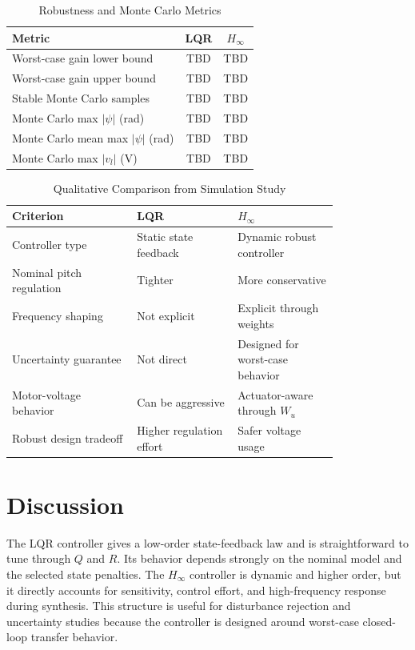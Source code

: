\documentclass[conference]{IEEEtran}
\begin{document}
\begin{table}[!t]
\caption{Robustness and Monte Carlo Metrics}
\label{tab:robust_metrics}
\centering
\begin{tabular}{lcc}
\toprule
Metric & LQR & $H_\infty$\\
\midrule
Worst-case gain lower bound & TBD & TBD\\
Worst-case gain upper bound & TBD & TBD\\
Stable Monte Carlo samples & TBD & TBD\\
Monte Carlo max $|\psi|$ (rad) & TBD & TBD\\
Monte Carlo mean max $|\psi|$ (rad) & TBD & TBD\\
Monte Carlo max $|v_l|$ (V) & TBD & TBD\\
\bottomrule
\end{tabular}
\end{table}

\begin{table}[!t]
\caption{Qualitative Comparison from Simulation Study}
\label{tab:qualitative}
\centering
\begin{tabular}{p{0.31\linewidth}p{0.25\linewidth}p{0.25\linewidth}}
\toprule
Criterion & LQR & $H_\infty$\\
\midrule
Controller type & Static state feedback & Dynamic robust controller\\
Nominal pitch regulation & Tighter & More conservative\\
Frequency shaping & Not explicit & Explicit through weights\\
Uncertainty guarantee & Not direct & Designed for worst-case behavior\\
Motor-voltage behavior & Can be aggressive & Actuator-aware through $W_u$\\
Robust design tradeoff & Higher regulation effort & Safer voltage usage\\
\bottomrule
\end{tabular}
\end{table}

\section{Discussion}
The LQR controller gives a low-order state-feedback law and is straightforward to tune through $Q$ and $R$. Its behavior depends strongly on the nominal model and the selected state penalties. The $H_\infty$ controller is dynamic and higher order, but it directly accounts for sensitivity, control effort, and high-frequency response during synthesis. This structure is useful for disturbance rejection and uncertainty studies because the controller is designed around worst-case closed-loop transfer behavior.
\end{document}
